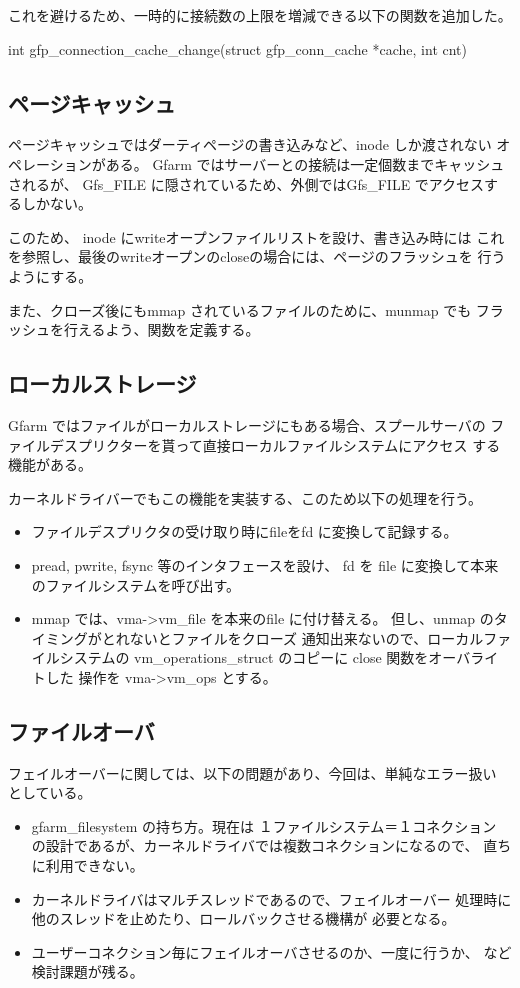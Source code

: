 	これを避けるため、一時的に接続数の上限を増減できる以下の関数を追加した。

	int gfp_connection_cache_change(struct gfp_conn_cache *cache, int cnt)

\subsection{ページキャッシュ}
	ページキャッシュではダーティページの書き込みなど、inode しか渡されない
	オペレーションがある。
	Gfarm ではサーバーとの接続は一定個数までキャッシュされるが、
	Gfs_FILE に隠されているため、外側ではGfs_FILE でアクセスするしかない。

	このため、 inode にwriteオープンファイルリストを設け、書き込み時には
	これを参照し、最後のwriteオープンのcloseの場合には、ページのフラッシュを
	行うようにする。

	また、クローズ後にもmmap されているファイルのために、munmap でも
	フラッシュを行えるよう、関数を定義する。

\subsection{ローカルストレージ}
	Gfarm ではファイルがローカルストレージにもある場合、スプールサーバの
	ファイルデスプリクターを貰って直接ローカルファイルシステムにアクセス
	する機能がある。
	
	カーネルドライバーでもこの機能を実装する、このため以下の処理を行う。
	\begin{itemize}
	\item	ファイルデスプリクタの受け取り時にfileをfd に変換して記録する。
	\item	pread, pwrite, fsync 等のインタフェースを設け、
		fd を file に変換して本来のファイルシステムを呼び出す。
	\item	mmap では、vma->vm_file を本来のfile に付け替える。
		但し、unmap のタイミングがとれないとファイルをクローズ
		通知出来ないので、ローカルファイルシステムの
		vm_operations_struct のコピーに close 関数をオーバライトした
		操作を vma->vm_ops とする。
	\end{itemize}

\subsection{ファイルオーバ}
	フェイルオーバーに関しては、以下の問題があり、今回は、単純なエラー扱い
	としている。
	\begin{itemize}
	\item	gfarm_filesystem の持ち方。現在は
		１ファイルシステム＝１コネクション
		の設計であるが、カーネルドライバでは複数コネクションになるので、
		直ちに利用できない。
	\item	カーネルドライバはマルチスレッドであるので、フェイルオーバー
		処理時に他のスレッドを止めたり、ロールバックさせる機構が
		必要となる。
	\item	ユーザーコネクション毎にフェイルオーバさせるのか、一度に行うか、
		など検討課題が残る。
	\end{itemize}

